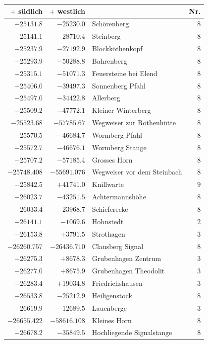 \begin{center}\begingroup\fontsize{8}{9}\selectfont
\setlength{\tabcolsep}{4pt}
\begin{tabular}{r|r|p{170pt}|r}\hline
\(+\) südlich&\(+\) westlich&&Nr.\\\hline
\(-25131.8\)&\(-25230.0\)&Schörenberg&\(8\)\\
\(-25141.1\)&\(-28710.4\)&Steinberg&\(8\)\\
\(-25237.9\)&\(-27192.9\)&Blockköthenkopf&\(8\)\\
\(-25293.9\)&\(-50288.8\)&Bahrenberg&\(8\)\\
\(-25315.1\)&\(-51071.3\)&Feuersteine bei Elend&\(8\)\\
\(-25406.0\)&\(-39497.3\)&Sonnenberg Pfahl&\(8\)\\
\(-25497.0\)&\(-34422.8\)&Allerberg&\(8\)\\
\(-25509.2\)&\(-47772.1\)&Kleiner Winterberg&\(8\)\\
\(-25523.68\)&\(-57785.67\)&Wegweiser zur Rothenhütte&\(8\)\\
\(-25570.5\)&\(-46684.7\)&Wormberg Pfahl&\(8\)\\
\(-25572.7\)&\(-46676.1\)&Wormberg Stange&\(8\)\\
\(-25707.2\)&\(-57185.4\)&Grosses Horn&\(8\)\\
\(-25748.408\)&\(-55691.076\)&Wegweiser vor dem Steinbach&\(8\)\\
\(-25842.5\)&\(+41741.0\)&Knillwarte&\(9\)\\
\(-26023.7\)&\(-43251.5\)&Achtermannshöhe&\(8\)\\
\(-26033.4\)&\(-23968.7\)&Schieferecke&\(8\)\\
\(-26141.1\)&\(-1069.6\)&Hohnstedt&\(2\)\\
\(-26153.8\)&\(+3791.5\)&Strothagen&\(3\)\\
\(-26260.757\)&\(-26436.710\)&Clausberg Signal&\(8\)\\
\(-26275.3\)&\(+8678.3\)&Grubenhagen Zentrum&\(3\)\\
\(-26277.0\)&\(+8675.9\)&Grubenhagen Theodolit&\(3\)\\
\(-26283.4\)&\(+19034.8\)&Friedrichshausen&\(3\)\\
\(-26533.8\)&\(-25212.9\)&Heiligenstock&\(8\)\\
\(-26619.9\)&\(-12689.5\)&Lauenberge&\(3\)\\
\(-26655.422\)&\(-58616.108\)&Kleines Horn&\(8\)\\
\(-26678.2\)&\(-35849.5\)&Hochliegende Signalstange&\(8\)\\

\end{tabular}
\end{center}
